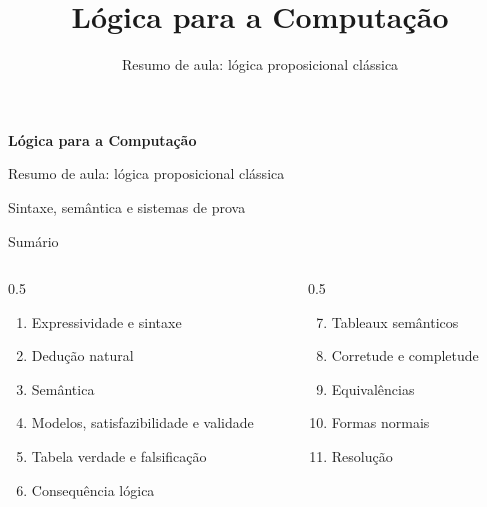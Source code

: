 \documentclass[10pt,aspectratio=169]{beamer}
\title{Lógica para a Computação}
\subtitle{Resumo de aula: lógica proposicional clássica}
\author{}
\date{}
\begin{document}
\begin{frame}[plain]
\vfill
{\LARGE\bfseries Lógica para a Computação\par}
\medskip
{\large Resumo de aula: lógica proposicional clássica\par}
\bigskip
{\color{mAccent} Sintaxe, semântica e sistemas de prova\par}
\vfill
\end{frame}

\begin{frame}{Sumário}
  \small
  \begin{columns}[T]
    \begin{column}{0.5\textwidth}
      \begin{enumerate}
        \item Expressividade e sintaxe
        \item Dedução natural
        \item Semântica
        \item Modelos, satisfazibilidade e validade
        \item Tabela verdade e falsificação
        \item Consequência lógica
      \end{enumerate}
    \end{column}
    \begin{column}{0.5\textwidth}
      \begin{enumerate}
        \setcounter{enumi}{6}
        \item Tableaux semânticos
        \item Corretude e completude
        \item Equivalências
        \item Formas normais
        \item Resolução
      \end{enumerate}
    \end{column}
  \end{columns}
\end{frame}

\end{document}
